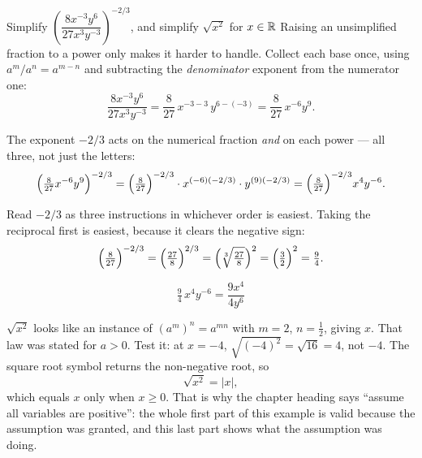 \begin{worked}{Simplify $\left(\dfrac{8x^{-3}y^{6}}{27x^{3}y^{-3}}\right)^{-2/3}$, and simplify $\sqrt{x^{2}}$ for $x\in\mathbb{R}$}
Raising an unsimplified fraction to a power only makes it harder to handle. Collect each base
once, using $a^{m}/a^{n}=a^{m-n}$ and subtracting the \emph{denominator}
exponent from the numerator one:
\[
  \frac{8x^{-3}y^{6}}{27x^{3}y^{-3}}
  =\frac{8}{27}\,x^{-3-3}\,y^{6-(-3)}
  =\frac{8}{27}\,x^{-6}y^{9} .
\]

The exponent $-2/3$ acts on the numerical fraction \emph{and} on each
power --- all three, not just the letters:
\[
  \Bigl(\tfrac{8}{27}x^{-6}y^{9}\Bigr)^{-2/3}
  =\Bigl(\tfrac{8}{27}\Bigr)^{-2/3}\cdot x^{(-6)(-2/3)}\cdot y^{(9)(-2/3)}
  =\Bigl(\tfrac{8}{27}\Bigr)^{-2/3}x^{4}y^{-6} .
\]

Read $-2/3$ as three instructions in whichever order is easiest. Taking the
reciprocal first is easiest, because it clears the negative sign:
\[
  \Bigl(\tfrac{8}{27}\Bigr)^{-2/3}
  =\Bigl(\tfrac{27}{8}\Bigr)^{2/3}
  =\Bigl(\sqrt[3]{\tfrac{27}{8}}\Bigr)^{2}
  =\Bigl(\tfrac{3}{2}\Bigr)^{2}
  =\tfrac{9}{4}.
\]

\[
  \tfrac{9}{4}\,x^{4}y^{-6}=\boxed{\dfrac{9x^{4}}{4y^{6}}}
\]

$\sqrt{x^{2}}$ looks like an instance of $(a^{m})^{n}=a^{mn}$ with
$m=2$, $n=\tfrac12$, giving $x$. That law was stated for $a>0$. Test it:
at $x=-4$, $\sqrt{(-4)^{2}}=\sqrt{16}=4$, not $-4$. The square root symbol
returns the non-negative root, so
\[
  \sqrt{x^{2}}=|x| ,
\]
which equals $x$ only when $x\ge0$. That is why the chapter heading says
``assume all variables are positive'': the whole first part of this example
is valid because the assumption was granted, and this last part shows what
the assumption was doing.
\end{worked}


